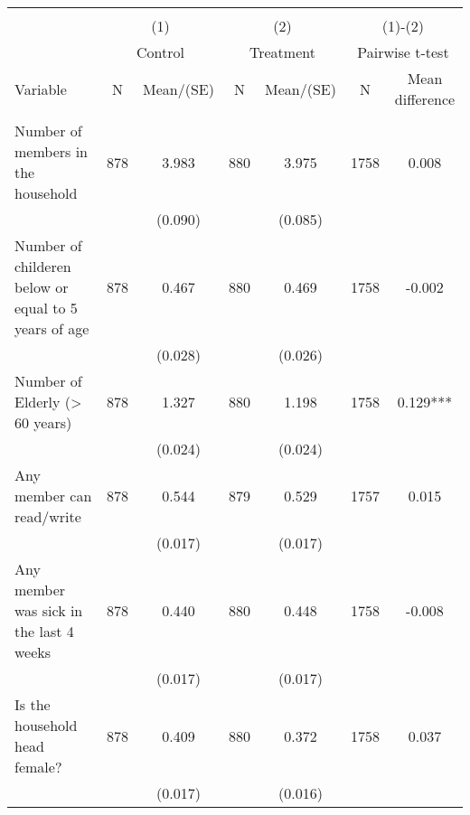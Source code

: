 
\begin{tabular}{@{\extracolsep{5pt}}lcccccc}
\\[-1.8ex]\hline \hline \\[-1.8ex]
 & \multicolumn{2}{c}{(1)}  & \multicolumn{2}{c}{(2)}  & \multicolumn{2}{c}{(1)-(2)} \\
 & \multicolumn{2}{c}{Control}  & \multicolumn{2}{c}{Treatment}  & \multicolumn{2}{c}{Pairwise t-test}  \\
Variable & N & Mean/(SE) & N & Mean/(SE) & N & Mean difference \\ \hline \\[-1.8ex] 
Number of members in the household   & 878    & 3.983    & 880    & 3.975    & 1758    & 0.008   \\
 &   & (0.090)  &   & (0.085)  &   &  \\ [1ex]
Number of childeren below or equal to 5 years of age   & 878    & 0.467    & 880    & 0.469    & 1758    & -0.002   \\
 &   & (0.028)  &   & (0.026)  &   &  \\ [1ex]
Number of Elderly (> 60 years)   & 878    & 1.327    & 880    & 1.198    & 1758    & 0.129***   \\
 &   & (0.024)  &   & (0.024)  &   &  \\ [1ex]
Any member can read/write   & 878    & 0.544    & 879    & 0.529    & 1757    & 0.015   \\
 &   & (0.017)  &   & (0.017)  &   &  \\ [1ex]
Any member was sick in the last 4 weeks   & 878    & 0.440    & 880    & 0.448    & 1758    & -0.008   \\
 &   & (0.017)  &   & (0.017)  &   &  \\ [1ex]
Is the household head female?   & 878    & 0.409    & 880    & 0.372    & 1758    & 0.037   \\
 &   & (0.017)  &   & (0.016)  &   &  \\ [1ex]

\end{tabular}
